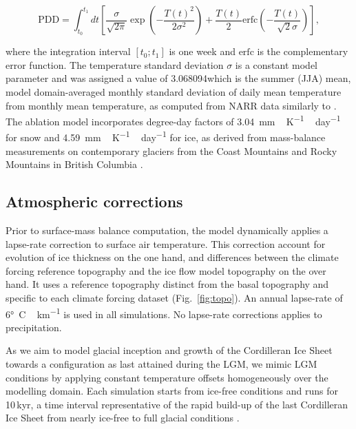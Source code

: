 \begin{equation}
	\mathrm{PDD} = \int_{t_0}^{t_1} dt \left[
		\frac{\sigma}{\sqrt{2\pi}}
		\exp\left({-\frac{T(t)^2}{2\sigma^2}}\right)
		+\frac{T(t)}{2}
		\mathrm{erfc} \left(-\frac{T(t)}{\sqrt{2}\sigma}\right)
	\right],
\end{equation}

where the integration interval $[t_0; t_1]$ is one week and $\mathrm{erfc}$ is the complementary error function. The temperature standard deviation $\sigma$ is a constant model parameter and was assigned a value of 3.068094\degC which is the summer (JJA) mean, model domain-averaged monthly standard deviation of daily mean temperature from monthly mean temperature, as computed from NARR data similarly to \citet{seguinot-inreview}. The ablation model incorporates degree-day factors of 3.04~\unit{mm\,K^{-1}\,day^{-1}} for snow and 4.59~\unit{mm\,K^{-1}\,day^{-1}} for ice, as derived from mass-balance measurements on contemporary glaciers from the Coast Mountains and Rocky Mountains in British Columbia \citep{shea-etal-2009}.


\subsection{Atmospheric corrections}

Prior to surface-mass balance computation, the model dynamically applies a lapse-rate correction to surface air temperature. This correction account for evolution of ice thickness on the one hand, and differences between the climate forcing reference topography and the ice flow model topography on the over hand. It uses a reference topography distinct from the basal topography and specific to each climate forcing dataset (Fig.~\ref{fig:topo}). An annual lapse-rate of 6\unit{\degree C\,km^{-1}} is used in all simulations. No lapse-rate corrections applies to precipitation.

As we aim to model glacial inception and growth of the Cordilleran Ice Sheet towards a configuration as last attained during the LGM, we mimic LGM conditions by applying constant temperature offsets homogeneously over the modelling domain. Each simulation starts from ice-free conditions and runs for 10\,kyr, a time interval representative of the rapid build-up of the last Cordilleran Ice Sheet from nearly ice-free to full glacial conditions \citep{clague-1989,stroeven-etal-2010}.
